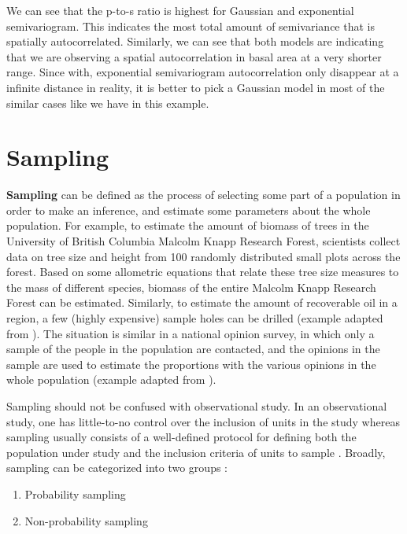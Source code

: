 \documentclass[
]{book}
\providecommand{\tightlist}{%
  \setlength{\itemsep}{0pt}\setlength{\parskip}{0pt}}
\begin{document}
We can see that the p-to-s ratio is highest for Gaussian and exponential semivariogram. This indicates the most total amount of semivariance that is spatially autocorrelated. Similarly, we can see that both models are indicating that we are observing a spatial autocorrelation in basal area at a very shorter range. Since with, exponential semivariogram autocorrelation only disappear at a infinite distance in reality, it is better to pick a Gaussian model in most of the similar cases like we have in this example.

\hypertarget{sampling}{%
\section{Sampling}\label{sampling}}

\textbf{Sampling} can be defined as the process of selecting some part of a population in order to make an inference, and estimate some parameters about the whole population\citep{thompson_sampling_2012}. For example, to estimate the amount of biomass of trees in the University of British Columbia Malcolm Knapp Research Forest, scientists collect data on tree size and height from 100 randomly distributed small plots across the forest. Based on some allometric equations that relate these tree size measures to the mass of different species, biomass of the entire Malcolm Knapp Research Forest can be estimated. Similarly, to estimate the amount of recoverable oil in a region, a few (highly expensive) sample holes can be drilled (example adapted from \citet{thompson_sampling_2012}). The situation is similar in a national opinion survey, in which only a sample of the people in the population are contacted, and the opinions in the sample are used to estimate the proportions with the various opinions in the whole population (example adapted from \citet{thompson_sampling_2012}).

Sampling should not be confused with observational study. In an observational study, one has little-to-no control over the inclusion of units in the study whereas sampling usually consists of a well-defined protocol for defining both the population under study and the inclusion criteria of units to sample \citep{thompson_sampling_2012}. Broadly, sampling can be categorized into two groups \citep{teddlie_mixed_2007}:

\begin{enumerate}
\def\labelenumi{\arabic{enumi}.}
\tightlist
\item
  Probability sampling
\item
  Non-probability sampling
\end{enumerate}
\end{document}
